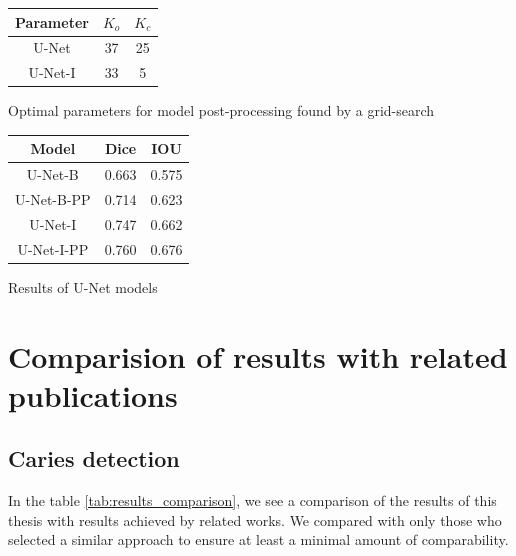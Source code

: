 \begin{minipage}{\textwidth}

    \begin{minipage}[t]{0.48\textwidth}
        \centering
        \makeatletter{}
        \begin{tabular}{|c|c|c|}
            \hline
            Parameter & $K_o$ & $K_c$ \\ \hline
            U-Net     & 37    & 25    \\ \hline
            U-Net-I   & 33    & 5     \\ \hline
        \end{tabular}
        \caption{Optimal parameters for model post-processing found by a grid-search}
        \label{tab:unet_seg_hyperparams}
    \end{minipage}
    \begin{minipage}[t]{0.48\textwidth}
        \centering
        \makeatletter{}
        \begin{tabular}{|c|c|c|}
            \hline
            Model      & Dice  & IOU   \\ \hline
            U-Net-B    & 0.663 & 0.575 \\ \hline
            U-Net-B-PP & 0.714 & 0.623 \\ \hline
            U-Net-I    & 0.747 & 0.662 \\ \hline
            U-Net-I-PP & 0.760 & 0.676 \\ \hline
        \end{tabular}
        \caption{Results of U-Net models}
        \label{tab:unet_seg_results}
    \end{minipage}
\end{minipage}


\section{Comparision of results with related publications}
\label{sec:result_comparision_with_lit}
\subsection{Caries detection}
In the table \ref{tab:results_comparison}, we see a comparison of the results of this thesis with results achieved by related works. We compared with only those who selected a similar approach to ensure at least a minimal amount of comparability.

